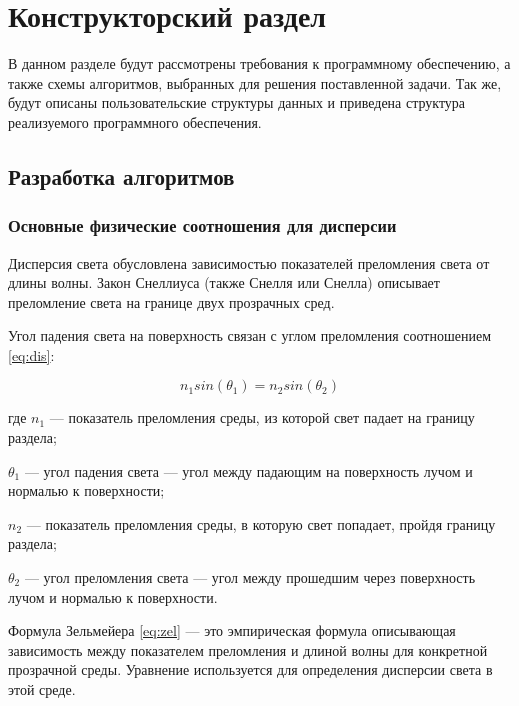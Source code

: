 \chapter{Конструкторский раздел}

    В данном разделе будут рассмотрены требования к программному обеспечению, а также схемы алгоритмов, выбранных для решения поставленной задачи. Так же, будут описаны пользовательские структуры данных и приведена структура реализуемого программного обеспечения.
    
    \section{Разработка алгоритмов}
    
        \subsection{Основные физические соотношения для дисперсии}
    
            Дисперсия света обусловлена зависимостью показателей преломления света от длины волны. Закон Снеллиуса (также Снелля или Снелла) описывает преломление света на границе двух прозрачных сред.
        
            Угол падения света на поверхность связан с углом преломления соотношением \eqref{eq:dis}:
        
            \begin{equation}
               n_{1} sin(\theta_{1}) = n_{2} sin(\theta_{2}) \label{eq:dis}
            \end{equation}
            
            где $n_{1}$ — показатель преломления среды, из которой свет падает на границу раздела;
            
            $\theta_{1}$ — угол падения света — угол между падающим на поверхность лучом и нормалью к поверхности;
            
            $n_{2}$ — показатель преломления среды, в которую свет попадает, пройдя границу раздела;
            
            $\theta_{2}$ — угол преломления света — угол между прошедшим через поверхность лучом и нормалью к поверхности.
            
    
            Формула Зельмейера \eqref{eq:zel} — это эмпирическая формула описывающая зависимость между показателем преломления и длиной волны для конкретной прозрачной среды. Уравнение используется для определения дисперсии света в этой среде. 
            
